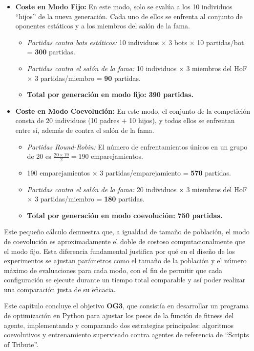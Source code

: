 \begin{itemize}
    \item \textbf{Coste en Modo Fijo:} En este modo, solo se evalúa a los 10 individuos ``hijos'' de la nueva generación. Cada uno de ellos se enfrenta al conjunto de oponentes estáticos y a los miembros del salón de la fama.
    \begin{itemize}
        \item \textit{Partidas contra bots estáticos:} 10 individuos $\times$ 3 bots $\times$ 10 partidas/bot = \textbf{300} partidas.
        \item \textit{Partidas contra el salón de la fama:} 10 individuos $\times$ 3 miembros del HoF $\times$ 3 partidas/miembro = \textbf{90} partidas.
        \item \textbf{Total por generación en modo fijo: 390 partidas.}
    \end{itemize}
    \vspace{0.5cm}
    
    \item \textbf{Coste en Modo Coevolución:} En este modo, el conjunto de la competición consta de 20 individuos (10 padres + 10 hijos), y todos ellos se enfrentan entre sí, además de contra el salón de la fama.
    \begin{itemize}
        \item \textit{Partidas Round-Robin:} El número de enfrentamientos únicos en un grupo de 20 es $\frac{20 \times 19}{2} = 190$ emparejamientos.
        \item 190 emparejamientos $\times$ 3 partidas/emparejamiento = \textbf{570} partidas.
        \item \textit{Partidas contra el salón de la fama:} 20 individuos $\times$ 3 miembros del HoF $\times$ 3 partidas/miembro = \textbf{180} partidas.
        \item \textbf{Total por generación en modo coevolución: 750 partidas.}
    \end{itemize}
\end{itemize}

Este pequeño cálculo demuestra que, a igualdad de tamaño de población, el modo de coevolución es aproximadamente el doble de costoso computacionalmente que el modo fijo. Esta diferencia fundamental justifica por qué en el diseño de los experimentos se ajustan parámetros como el tamaño de la población y el número máximo de evaluaciones para cada modo, con el fin de permitir que cada configuración se ejecute durante un tiempo total comparable y así poder realizar una comparación justa de su eficacia.

Este capítulo concluye el objetivo \textbf{OG3}, que consistía en desarrollar un programa de optimización en Python para ajustar los pesos de la función de fitness del agente, implementando y comparando dos estrategias principales: algoritmos coevolutivos y entrenamiento supervisado contra agentes de referencia de ``Scripts of Tribute''.
